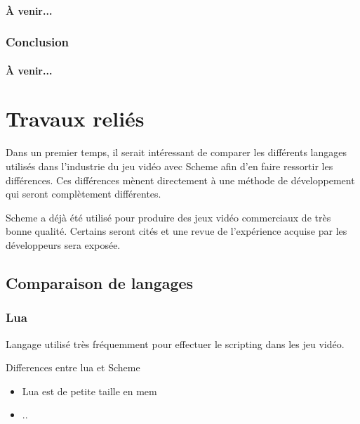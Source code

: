 \documentclass[12pt,oneside,letterpaper,francais]{book}
\begin{document}
\subsubsection{À venir...}

\subsection{Conclusion}
\subsubsection{À venir...}




\chapter{Travaux reliés}

Dans un premier temps, il serait intéressant de comparer les
différents langages utilisés dans l'industrie du jeu vidéo avec Scheme
afin d'en faire ressortir les différences. Ces différences mènent
directement à une méthode de développement qui seront complètement
différentes.

Scheme a déjà été utilisé pour produire des jeux vidéo commerciaux de
très bonne qualité. Certains seront cités et une revue de l'expérience
acquise par les développeurs sera exposée.

\section{Comparaison de langages}

\subsection{Lua}
Langage utilisé très fréquemment pour effectuer le \og scripting \fg
dans les jeu vidéo.

Differences entre lua et Scheme
\begin{itemize}
\item Lua est de petite taille en mem
\item ..
\end{itemize}
\end{document}
